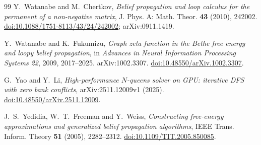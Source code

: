 \begin{thebibliography}{99}
 Y.~Watanabe and M.~Chertkov, \emph{Belief propagation and loop calculus for the permanent of a
non-negative matrix}, J. Phys. A: Math. Theor. \textbf{43} (2010), 242002.
\href{https://doi.org/10.1088/1751-8113/43/24/242002}{doi:10.1088/1751-8113/43/24/242002}; arXiv:0911.1419.

 Y.~Watanabe and K.~Fukumizu, \emph{Graph zeta function in the Bethe free energy and loopy
belief propagation}, in \emph{Advances in Neural Information Processing Systems 22}, 2009,
2017--2025. arXiv:1002.3307.
\href{https://doi.org/10.48550/arXiv.1002.3307}{doi:10.48550/arXiv.1002.3307}.

 G.~Yao and Y.~Li, \emph{High-performance $N$-queens solver on GPU: iterative DFS with zero
bank conflicts}, arXiv:2511.12009v1 (2025).
\href{https://doi.org/10.48550/arXiv.2511.12009}{doi:10.48550/arXiv.2511.12009}.

 J.~S.~Yedidia, W.~T.~Freeman and Y.~Weiss, \emph{Constructing free-energy approximations and
generalized belief propagation algorithms}, IEEE Trans. Inform. Theory \textbf{51} (2005), 2282--2312.
\href{https://doi.org/10.1109/TIT.2005.850085}{doi:10.1109/TIT.2005.850085}.

\end{thebibliography}
